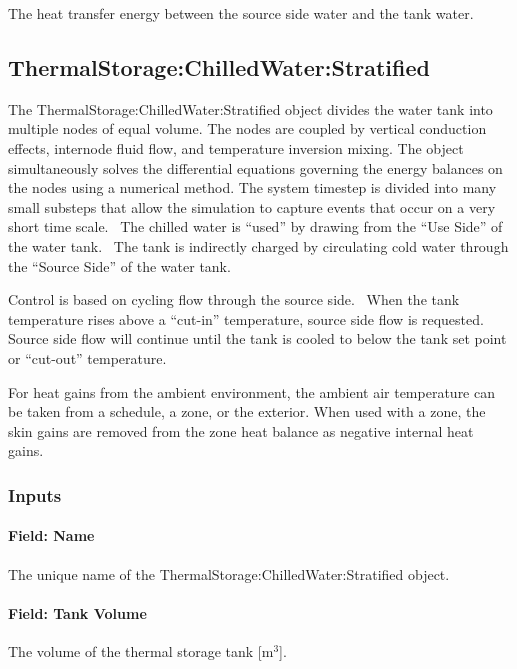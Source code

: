 The heat transfer energy between the source side water and the tank water.

\subsection{ThermalStorage:ChilledWater:Stratified}\label{thermalstoragechilledwaterstratified}

The ThermalStorage:ChilledWater:Stratified object divides the water tank into multiple nodes of equal volume. The nodes are coupled by vertical conduction effects, internode fluid flow, and temperature inversion mixing. The object simultaneously solves the differential equations governing the energy balances on the nodes using a numerical method. The system timestep is divided into many small substeps that allow the simulation to capture events that occur on a very short time scale.~ The chilled water is ``used'' by drawing from the ``Use Side'' of the water tank.~ The tank is indirectly charged by circulating cold water through the ``Source Side'' of the water tank.

Control is based on cycling flow through the source side.~ When the tank temperature rises above a ``cut-in'' temperature, source side flow is requested.~ Source side flow will continue until the tank is cooled to below the tank set point or ``cut-out'' temperature.

For heat gains from the ambient environment, the ambient air temperature can be taken from a schedule, a zone, or the exterior. When used with a zone, the skin gains are removed from the zone heat balance as negative internal heat gains.

\subsubsection{Inputs}\label{inputs-23-003}

\paragraph{Field: Name}\label{field-name-23-001}

The unique name of the ThermalStorage:ChilledWater:Stratified object.

\paragraph{Field: Tank Volume}\label{field-tank-volume-1}

The volume of the thermal storage tank {[}m\(^{3}\){]}.

